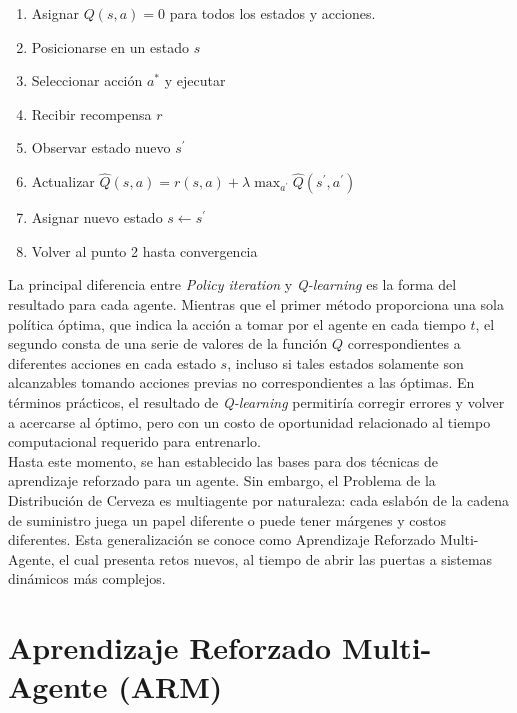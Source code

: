 \begin{enumerate}
    \item Asignar $Q(s,a) = 0$ para todos los estados y acciones.
    \item Posicionarse en un estado $s$
    \item Seleccionar acci\'on $a^{*}$ y ejecutar
    \item Recibir recompensa $r$
    \item Observar estado nuevo $s^{'}$
    \item Actualizar $\hat{Q}(s,a) = r(s,a) + \lambda \max _{ a^{'} }{  \hat{Q}(s^{'},a^{'}) }$
    \item Asignar nuevo estado $s \leftarrow s^{'}$
    \item Volver al punto 2 hasta convergencia
\end{enumerate}

La principal diferencia entre \textit{Policy iteration} y \textit{Q-learning} es la forma del resultado para cada agente. Mientras que el primer m\'etodo proporciona una sola pol\'itica \'optima, que indica la acci\'on a tomar por el agente en cada tiempo $t$, el segundo consta de una serie de valores de la funci\'on $Q$ correspondientes a diferentes acciones en cada estado $s$, incluso si tales estados solamente son alcanzables tomando acciones previas no correspondientes a las \'optimas. En t\'erminos pr\'acticos, el resultado de \textit{Q-learning} permitir\'ia corregir errores y volver a acercarse al \'optimo, pero con un costo de oportunidad relacionado al tiempo computacional requerido para entrenarlo.\\

Hasta este momento, se han establecido las bases para dos t\'ecnicas de aprendizaje reforzado para un agente. Sin embargo, el Problema de la Distribución de Cerveza es multiagente por naturaleza: cada eslab\'on de la cadena de suministro juega un papel diferente o puede tener m\'argenes y costos diferentes. Esta generalizaci\'on se conoce como Aprendizaje Reforzado Multi-Agente, el cual presenta retos nuevos, al tiempo de abrir las puertas a sistemas din\'amicos m\'as complejos.

\section{Aprendizaje Reforzado Multi-Agente (ARM)}


